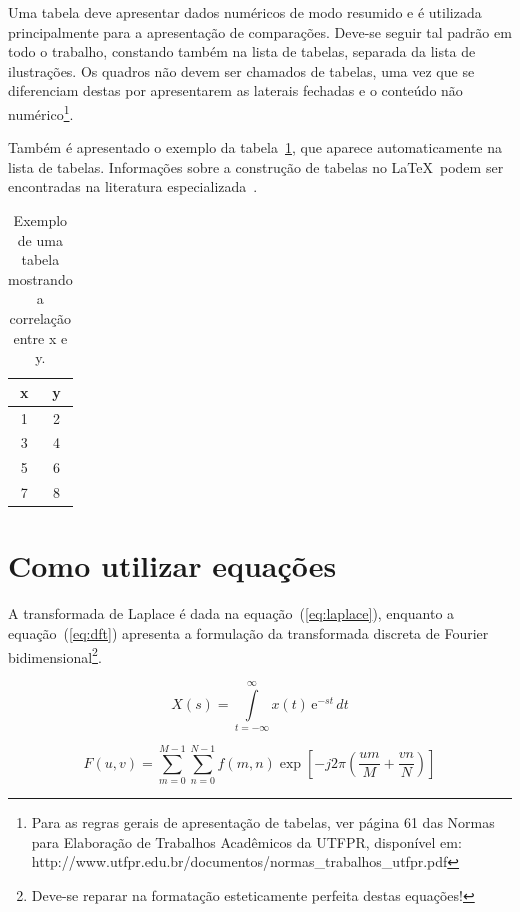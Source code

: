 Uma tabela deve apresentar dados numéricos de modo resumido e é utilizada principalmente para a apresentação de comparações. Deve-se seguir tal padrão em todo o trabalho, constando também na lista de tabelas, separada da lista de ilustrações. Os quadros não devem ser chamados de tabelas, uma vez que se diferenciam destas por apresentarem as laterais fechadas e o conteúdo não numérico\footnote{Para as regras gerais de apresentação de tabelas, ver página 61 das Normas para Elaboração de Trabalhos Acadêmicos da UTFPR, dispon\'ivel em: http://www.utfpr.edu.br/documentos/normas\_trabalhos\_utfpr.pdf}.

Tamb\'em \'e apresentado o exemplo da tabela~\ref{tab:correlacao}, que aparece automaticamente na lista de tabelas. Informa\c{c}\~oes sobre a constru\c{c}\~ao de tabelas no \LaTeX\ podem ser encontradas na literatura especializada~\cite{Lamport1986,Buerger1989,Kopka2003,Mittelbach2004}.

\begin{table}[!htb]
	\centering
	\caption[Exemplo de uma tabela]{Exemplo de uma tabela mostrando a correla\c{c}\~ao entre x e y.}
	\label{tab:correlacao}
	\begin{tabular}{cc}
		\hline 
		x & y \\
		\hline
		1 & 2 \\
		3 & 4 \\
		5 & 6 \\
		7 & 8 \\
		\hline 
	\end{tabular}
\end{table}

\section{Como utilizar equações}

A transformada de Laplace \'e dada na equa\c{c}\~ao~(\ref{eq:laplace}), enquanto a equa\c{c}\~ao~(\ref{eq:dft}) apresenta a formula\c{c}\~ao da transformada discreta de Fourier bidimensional\footnote{Deve-se reparar na formata\c{c}\~ao esteticamente perfeita destas equa\c{c}\~oes!}.

\begin{equation}
X(s) = \int\limits_{t = -\infty}^{\infty} x(t) \, \text{e}^{-st} \, dt
\label{eq:laplace}
\end{equation}

\begin{equation}
F(u, v) = \sum_{m = 0}^{M - 1} \sum_{n = 0}^{N - 1} f(m, n) \exp \left[ -j 2 \pi \left( \frac{u m}{M} + \frac{v n}{N} \right) \right]
\label{eq:dft}
\end{equation}

